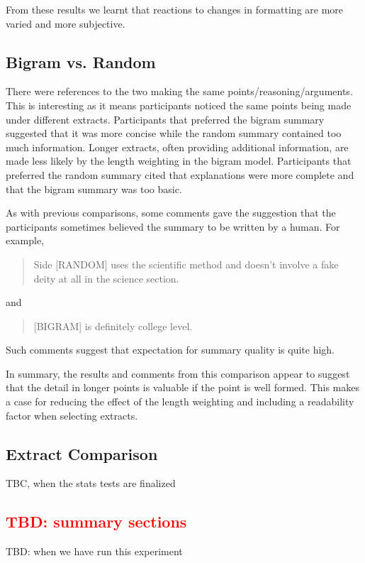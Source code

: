       From these results we learnt that reactions to changes in formatting are more varied and more subjective.

    \tocless\subsection{Bigram vs. Random}
      There were references to the two making the same points/reasoning/arguments. This is interesting as it means participants noticed the same points being made under different extracts. Participants that preferred the bigram summary suggested that it was more concise while the random summary contained too much information. Longer extracts, often providing additional information, are made less likely by the length weighting in the bigram model. Participants that preferred the random summary cited that explanations were more complete and that the bigram summary was too basic.

      As with previous comparisons, some comments gave the suggestion that the participants sometimes believed the summary to be written by a human. For example, \blockquote{Side [RANDOM] uses the scientific method and doesn't involve a fake deity at all in the science section.} and \blockquote{[BIGRAM] is definitely college level.}. Such comments suggest that expectation for summary quality is quite high.

      In summary, the results and comments from this comparison appear to suggest that the detail in longer points is valuable if the point is well formed. This makes a case for reducing the effect of the length weighting and including a readability factor when selecting extracts.

    \tocless\subsection{Extract Comparison}
      TBC, when the stats tests are finalized
    \tocless\subsection{\textcolor{red}{TBD: summary sections}}
      TBD: when we have run this experiment

